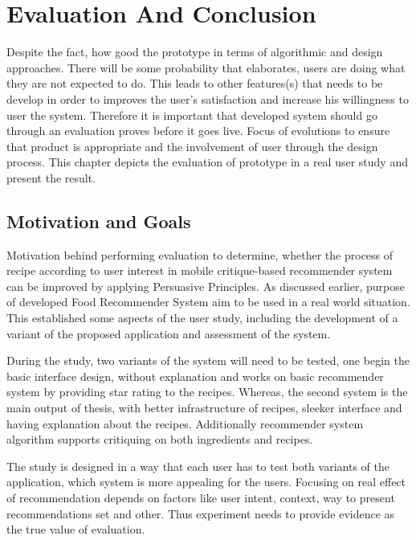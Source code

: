 \chapter{Evaluation And Conclusion}

Despite the fact, how good the prototype in terms of algorithmic and design approaches. There will be some probability that elaborates, users are doing what they are not expected to do.  This leads to other features(s) that needs to be develop in order to improves the user’s satisfaction and increase his willingness to user the system. Therefore it is important that developed system should go through an evaluation proves before it goes live. Focus of evolutions to ensure that product is appropriate and the involvement of user through the design process. This chapter depicts the evaluation of prototype in a real user study and present the result.

\section{Motivation and Goals}

Motivation behind performing evaluation to determine, whether the process of recipe according to user interest in mobile critique-based recommender system can be improved by applying Persuasive Principles. As discussed earlier, purpose of developed Food Recommender System aim to be used in a real world situation. This established some aspects of the user study, including the development of a variant of the proposed application and assessment of the system.\newline

During the study, two variants of the system will need to be tested, one begin the basic interface design, without explanation and works on basic recommender system by providing star rating to the recipes. Whereas, the second system is the main output of thesis, with better infrastructure of recipes, sleeker interface and having explanation about the recipes. Additionally recommender system algorithm supports critiquing on both ingredients and recipes.\newline 

The study is designed in a way that each user has to test both variants of the application, which system is more appealing for the users. Focusing on real effect of recommendation depends on factors like user intent, context, way to present recommendations set and other. Thus experiment needs to provide evidence as the true value of evaluation.\cite{shani2011evaluating} \newline

